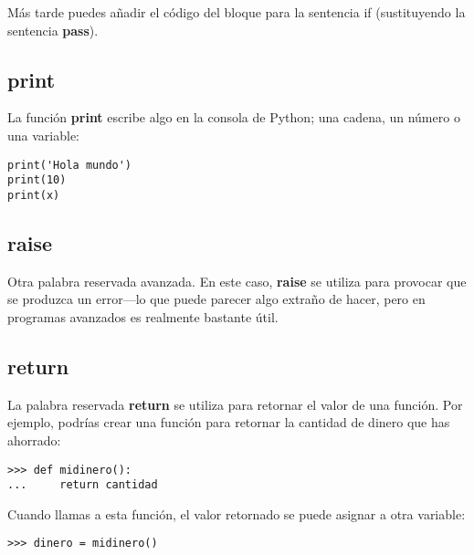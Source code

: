 \begin{listing}
\noindent
Más tarde puedes añadir el código del bloque para la sentencia if (sustituyendo la sentencia \textbf{pass}).

\subsection*{print}

La función \textbf{print} escribe algo en la consola de Python; una cadena, un número o una variable:

\begin{listing}
\begin{verbatim}
print('Hola mundo')
print(10)
print(x)
\end{verbatim}
\end{listing}

\subsection*{raise}

Otra palabra reservada avanzada.   En este caso, \textbf{raise} se utiliza para provocar que se produzca un error---lo que puede parecer algo extraño de hacer, pero en programas avanzados es realmente bastante útil.

\subsection*{return}

La palabra reservada \textbf{return} se utiliza para retornar el valor de una función.   Por ejemplo, podrías crear una función para retornar la cantidad de dinero que has ahorrado:

\begin{listingignore}
\begin{verbatim}
>>> def midinero():
...     return cantidad
\end{verbatim}
\end{listingignore}

\noindent
Cuando llamas a esta función, el valor retornado se puede asignar a otra variable:

\begin{listingignore}
\begin{verbatim}
>>> dinero = midinero()
\end{verbatim}
\end{listingignore}


\end{listing}
